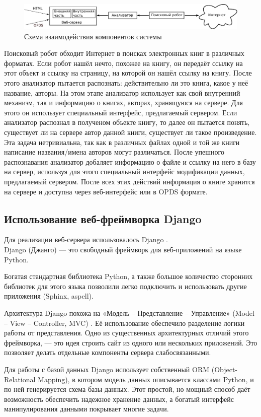 \begin{figure}
\centering
\includegraphics[width=.9\textwidth]{./head/innerstructure}
\caption{Схема взаимодействия компонентов системы}\label{fig:innerstructure}
\end{figure}

Поисковый робот обходит Интернет в поисках электронных книг в различных форматах. Если робот нашёл нечто, похожее на книгу, он передаёт ссылку на этот объект и ссылку на страницу, на которой он нашёл ссылку на книгу.
После этого анализатор пытается распознать: действительно ли это книга, какое у неё название, авторы. На этом этапе анализатор использует как свой внутренний механизм, так и информацию о книгах, авторах, хранящуюся на сервере. Для этого он использует специальный интерфейс, предлагаемый сервером.
Если анализатор распознал в полученом объекте книгу, то далее он пытается понять, существует ли на сервере автор данной книги, существует ли такое произведение. Эта задача нетривиальна, так как в различных файлах одной и той же книги написание названия/имена авторов могут различаться.
После упешного распознавания анализатор добаляет информацию о файле и ссылку на него в базу на сервер, используя для этого специальный интерфейс модификации данных, предлагаемый сервером.
После всех этих действий информация о книге хранится на сервере и доступна через веб-интерфейс или в OPDS формате.



\subsection{Использование веб-фреймворка Django}

Для реализации веб-сервера использовалось Django \cite{django}.\\
Django (Джанго) — это свободный фреймворк для веб-приложений на языке Python.

Богатая стандартная библиотека Python, а также большое количество сторонних библиотек для этого языка
позволили легко подключить и использовать другие приложения (Sphinx, aspell).

Архитектура Django похожа на «Модель -- Представление -- Управление» (Model -- View -- Controller, MVC) \cite{djangomvc}.
Её использование обеспечило разделение логики работы от представления. 
Одно из существенных архитектурных отличий этого фреймворка, ---
это идея строить сайт из одного или нескольких приложений.
Это позволяет делать отдельные компоненты сервера слабосвязанными.

Для работы с базой данных Django использует собственный ORM (Object-Relational Mapping),
в котором модель данных описывается классами Python, и по ней генерируется схема базы данных.
Этот простой, но мощный способ даёт возможность обеспечить надежное хранение данных,
а богатый интерфейс манипулирования данными покрывает многие задачи.
